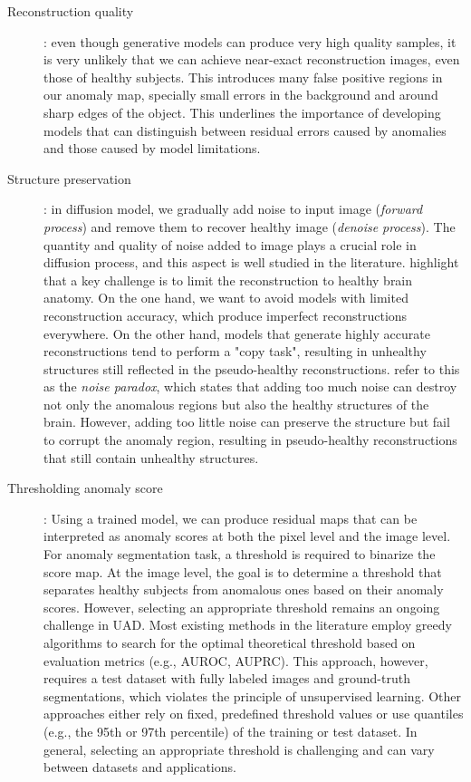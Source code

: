 \begin{description}
    \item[Reconstruction quality]: even though generative models can produce very high quality samples, it is very unlikely that we can achieve near-exact reconstruction images, even those of healthy subjects. This introduces many false positive regions in our anomaly map, specially small errors in the background and around sharp edges of the object. This underlines the importance of developing models that can distinguish between residual errors caused by anomalies and those caused by model limitations.
    
    
    \item[Structure preservation]: in diffusion model, we gradually add noise to input image (\emph{forward process}) and remove them to recover healthy image (\emph{denoise process}). The quantity and quality of noise added to image plays a crucial role in diffusion process, and this aspect is well studied in the literature. \cite{behrendt2025cDDPM} highlight that a key challenge is to limit the reconstruction to healthy brain anatomy. On the one hand, we want to avoid models with limited reconstruction accuracy, which produce imperfect reconstructions everywhere. On the other hand, models that generate highly accurate reconstructions tend to perform a "copy task", resulting in unhealthy structures still reflected in the pseudo-healthy reconstructions. \cite{autoDDPM} refer to this as the \emph{noise paradox}, which states that adding too much noise can destroy not only the anomalous regions but also the healthy structures of the brain. However, adding too little noise can preserve the structure but fail to corrupt the anomaly region, resulting in pseudo-healthy reconstructions that still contain unhealthy structures. 

    \item[Thresholding anomaly score]: Using a trained model, we can produce residual maps that can be interpreted as anomaly scores at both the pixel level and the image level. For anomaly segmentation task, a threshold is required to binarize the score map. At the image level, the goal is to determine a threshold that separates healthy subjects from anomalous ones based on their anomaly scores. However, selecting an appropriate threshold remains an ongoing challenge in \ac{UAD}. Most existing methods in the literature employ greedy algorithms to search for the optimal theoretical threshold based on evaluation metrics (e.g., AUROC, AUPRC). This approach, however, requires a test dataset with fully labeled images and ground-truth segmentations, which violates the principle of unsupervised learning. Other approaches either rely on fixed, predefined threshold values or use quantiles (e.g., the 95th or 97th percentile) of the training or test dataset. In general, selecting an appropriate threshold is challenging and can vary between datasets and applications.
\end{description}

